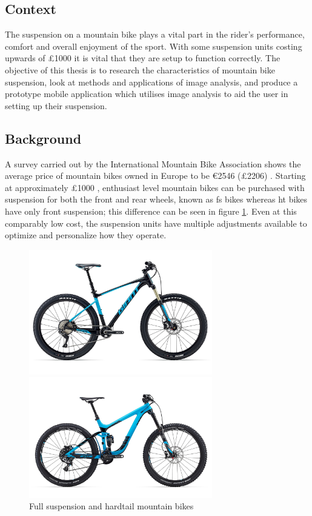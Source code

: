 \subsection{Context}
	The suspension on a mountain bike plays a vital part in the rider's performance, comfort and overall enjoyment of the sport. With some suspension units costing upwards of \pounds1000 it is vital that they are setup to function correctly. The objective of this thesis is to research the characteristics of mountain bike suspension, look at methods and applications of image analysis, and produce a prototype mobile application which utilises image analysis to aid the user in setting up their suspension.
\subsection{Background}
	A survey carried out by the International Mountain Bike Association shows the average price of mountain bikes owned in Europe to be \euro2546 (\pounds2206) \citep{imbasurv}. Starting at approximately \pounds1000 \citep{giantstance}, enthusiast level mountain bikes can be purchased with suspension for both the front and rear wheels, known as \gls{fs} bikes whereas \gls{ht} bikes have only front suspension; this difference can be seen in figure \ref{fig:fsandht}. Even at this comparably low cost, the suspension units have multiple adjustments available to optimize and personalize how they operate.
	\begin{figure}[h!]
		\centering
		\begin{minipage}{0.45\textwidth}
			\centering
			\includegraphics[width=8cm]{../images/2017_GIANT_FATHOM_1.jpg}
		\end{minipage}\hfill
		\begin{minipage}{0.45\textwidth}
			\centering
			\includegraphics[width=8cm]{../images/2016_Giant_Reign_Advanced_275_0.jpg}
		\end{minipage}
		\caption{Full suspension and hardtail mountain bikes}
		\label{fig:fsandht}
	\end{figure}

